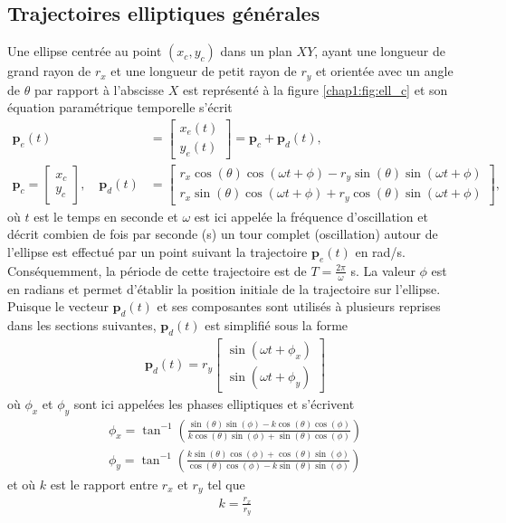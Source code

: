 \subsection{Trajectoires elliptiques générales}
Une ellipse centrée au point $(x_c, y_c)$ dans un plan $XY$, ayant une longueur de grand rayon de $r_x$ et une longueur de petit rayon de $r_y$ et orientée avec un angle de $\theta$ par rapport à l’abscisse $X$  est représenté à la figure \ref{chap1:fig:ell_c} et son équation paramétrique temporelle s'écrit 
\begin{align}
\mathbf{p}_e(t) &= \begin{bmatrix}
x_e(t)\\y_e(t)
\end{bmatrix} = \mathbf{p}_c +  \mathbf{p}_d(t), \label{chap1:eq:gen_ell}\\
\mathbf{p}_c =\begin{bmatrix}
x_c \\ y_c
\end{bmatrix},\quad \mathbf{p}_d(t) &=
\begin{bmatrix}
r_x\cos(\theta)\cos(\omega t+\phi)-r_y\sin(\theta)\sin(\omega t+\phi)\\
r_x\sin(\theta)\cos(\omega t+\phi)+r_y\cos(\theta)\sin(\omega t+\phi)
\end{bmatrix}, \label{chap1:eq:ell_base}
\end{align}
où $t$ est le temps en seconde et $\omega$ est ici appelée la fréquence d'oscillation et décrit combien de fois par seconde (s) un tour complet (oscillation) autour de l’ellipse est effectué par un point suivant la trajectoire $\mathbf{p}_e(t)$ en rad/s. Conséquemment, la période de cette trajectoire est de $T = \frac{2\pi}{\omega}$ s. La valeur $\phi$ est en radians et  permet d'établir la position initiale de la trajectoire sur l'ellipse. Puisque le vecteur $\mathbf{p}_d(t)$ et ses composantes sont utilisés à plusieurs reprises dans les sections suivantes, $\mathbf{p}_d(t)$ est simplifié sous la forme \begin{align}
\mathbf{p}_d(t) = r_y\begin{bmatrix}
\sin(\omega t+\phi_x)\\
\sin(\omega t+\phi_y)
\end{bmatrix} 
\label{chap1:eq:gen_ell_simp}
\end{align}
où $\phi_x$ et $\phi_y$ sont ici appelées les phases elliptiques et s'écrivent
\begin{align}
\phi_x = \tan^{-1}\left(\frac{\sin(\theta)\sin(\phi)-k\cos(\theta)\cos(\phi)}{k\cos(\theta)\sin(\phi)+\sin(\theta)\cos(\phi)}\right)\\
\phi_y = \tan^{-1}\left(\frac{k\sin(\theta)\cos(\phi)+\cos(\theta)\sin(\phi)}{\cos(\theta)\cos(\phi)-k\sin(\theta)\sin(\phi)}\right)
\end{align}
et où $k$ est le rapport entre $r_x$ et $r_y$ tel que 
\begin{align}
k =\frac{r_x}{r_y}
\end{align}

